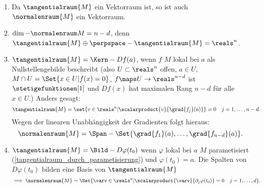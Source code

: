 \begin{bemerkungen}
  \begin{enumerate}
    \item Da \( \tangentialraum{M} \) ein Vektorraum ist, so ist auch \( \normalenraum{M} \) ein Vektorraum.
    \item \( \dim-{\normalenraum}{M}=n-d \), denn \( \tangentialraum{M}\oplus \perpspace-{\tangentialraum{M}}=\reals^n \).
    \item \( \tangentialraum{M}=\Kern-{Df(a)} \), wenn \( f \) \( M \) lokal bei \( a \) als Nullstellengebilde beschreibt (also \texists  \( U\subset \reals^n \) offen, \( a\in U \), \sd \( M\cap U=\Set{x\in U|f(x)=0} \), \( f\maps U\to \reals^{n-d} \) ist \( \stetigefunktionen[1] \) und \( Df(x) \) hat maximalen Rang \( n-d \) für alle \( x\in U \).) Anders gesagt: 
    \begin{equation*}
      \tangentialraum{M}=\set{v\in \reals^n|\scalarproduct{v}{\grad{f_j}(a)}}=0\quad j=1,\dotsc,n-d.
    \end{equation*}
    Wegen der linearen Unabhängigkeit der Gradienten folgt hieraus:
    \begin{equation*}
      \normalenraum{M}=\Span-{\Set{\grad{f_1}(a),\dotsc,\grad{f_{n-d}}(a)}}.
    \end{equation*}
    \item \( \tangentialraum{M}=\Bild-{D\varphi(t_0)} \) wenn \( \varphi \) lokal bei \( a \) \( M \) parametisiert (\vgl \ref{tangentialraum_durch_parametisierung}) und \( \varphi(t_0)=a \). Die Spalten von \( D\varphi(t_0) \) bilden eine Basis von \( \tangentialraum{M} \)
    \begin{equation*}
      \implies \normalenraum{M}=\Set{\varv\in \reals^n|\scalarproduct{\varv}{\partial_j \varphi(t_0)}=0\quad j=1,\dotsc,d}.
    \end{equation*}
  \end{enumerate}
\end{bemerkungen}
